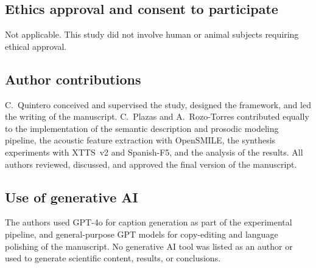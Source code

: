 \documentclass[pdflatex,iicol,sn-mathphys-num]{sn-jnl}%
\theoremstyle{thmstyleone}%
\theoremstyle{thmstyletwo}%
\theoremstyle{thmstylethree}%
\begin{document}
\subsection*{Ethics approval and consent to participate}
Not applicable. This study did not involve human or animal subjects requiring ethical approval.

\subsection*{Author contributions}
C.~Quintero conceived and supervised the study, designed the framework, and led the writing of the manuscript. C.~Plazas and A.~Rozo-Torres contributed equally to the implementation of the semantic description and prosodic modeling pipeline, the acoustic feature extraction with OpenSMILE, the synthesis experiments with XTTS~v2 and Spanish-F5, and the analysis of the results. All authors reviewed, discussed, and approved the final version of the manuscript.

\subsection*{Use of generative AI}
The authors used GPT-4o for caption generation as part of the experimental pipeline, and general-purpose GPT models for copy-editing and language polishing of the manuscript. No generative AI tool was listed as an author or used to generate scientific content, results, or conclusions.

\end{document}
